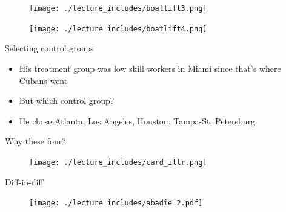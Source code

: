 \documentclass{beamer}
\begin{document}
\begin{frame}[plain]
	\begin{figure}
	\texttt{[image: ./lecture\_includes/boatlift3.png]}
	\end{figure}
\end{frame}

\begin{frame}[plain]
	\begin{figure}
	\texttt{[image: ./lecture\_includes/boatlift4.png]}
	\end{figure}
\end{frame}



\begin{frame}{Selecting control groups}

\begin{itemize}

\item His treatment group was low skill workers in Miami since that's where Cubans went
\item But which control group?
\item He chose Atlanta, Los Angeles, Houston, Tampa-St. Petersburg

\end{itemize}

\end{frame}



\begin{frame}{Why these four?}

	\begin{figure}
	\texttt{[image: ./lecture\_includes/card\_illr.png]}
	\end{figure}

\end{frame}

\begin{frame}{Diff-in-diff}
	
	\begin{figure}
	\texttt{[image: ./lecture\_includes/abadie\_2.pdf]}
	\end{figure}
\end{frame}
\end{document}
